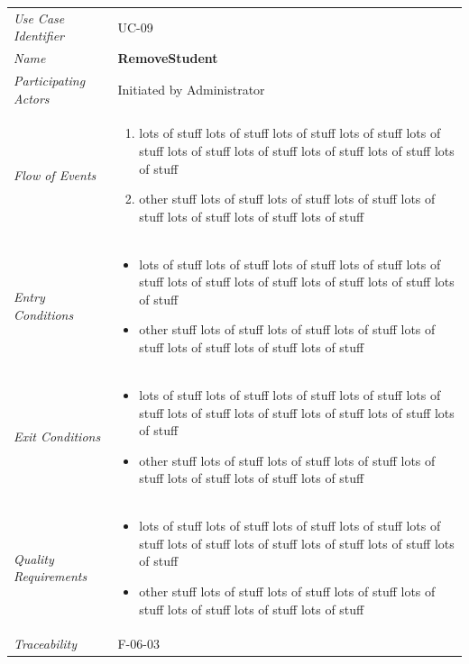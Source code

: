 \documentclass[12pt,letterpaper]{article}
\begin{document}
\begin{center}
	\begin{tabu} to 
		\toprule
		Use Case Identifier & UC-09 \\
		Name & {\bf RemoveStudent} \\
		Participating Actors & Initiated by Administrator \\
		Flow of Events & 
	    \begin{enumerate}[topsep=-1em]
		    \item lots of stuff lots of stuff lots of stuff lots of stuff lots of stuff lots of stuff lots of stuff lots of stuff lots of stuff lots of stuff
		    \item other stuff lots of stuff lots of stuff lots of stuff lots of stuff lots of stuff lots of stuff lots of stuff
		\end{enumerate} \\

		Entry Conditions &
		\begin{itemize}[topsep=-1em]
		    \item lots of stuff lots of stuff lots of stuff lots of stuff lots of stuff lots of stuff lots of stuff lots of stuff lots of stuff lots of stuff
		    \item other stuff lots of stuff lots of stuff lots of stuff lots of stuff lots of stuff lots of stuff lots of stuff
        \end{itemize} \\

		Exit Conditions &
		\begin{itemize}[topsep=-1em]
		    \item lots of stuff lots of stuff lots of stuff lots of stuff lots of stuff lots of stuff lots of stuff lots of stuff lots of stuff lots of stuff
		    \item other stuff lots of stuff lots of stuff lots of stuff lots of stuff lots of stuff lots of stuff lots of stuff
        \end{itemize} \\

		Quality Requirements &
		\begin{itemize}[topsep=-1em]
		    \item lots of stuff lots of stuff lots of stuff lots of stuff lots of stuff lots of stuff lots of stuff lots of stuff lots of stuff lots of stuff
		    \item other stuff lots of stuff lots of stuff lots of stuff lots of stuff lots of stuff lots of stuff lots of stuff
        \end{itemize} \\

		Traceability & F-06-03 \\
		\toprule
	\end{tabu}
\end{center}
\end{document}

